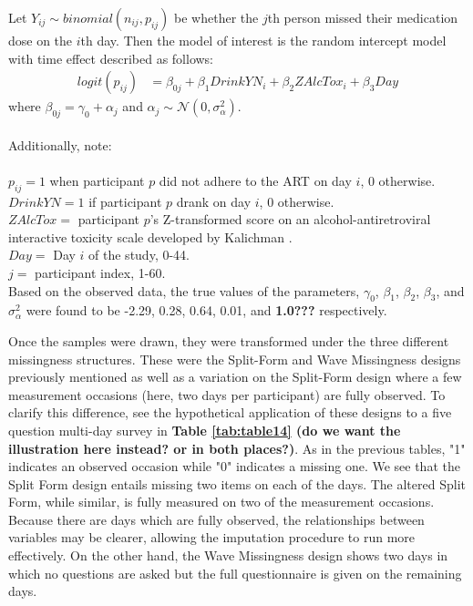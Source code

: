 \documentclass{svjour3}\usepackage[]{graphicx}\usepackage[]{color}
\begin{document}
Let $Y_{ij} \sim binomial(n_{ij},p_{ij})$ be whether the $j$th person missed their medication dose on the $i$th day. Then the model of interest is the random intercept model with time effect described as follows:
\begin{align*}
logit(p_{ij}) &= \beta_{0j} + \beta_1DrinkYN_i + \beta_2ZAlcTox_i +\beta_3Day
\end{align*}
where $\beta_{0j} = \gamma_0 + \alpha_j$ and $\alpha_j \sim \mathcal{N}(0,\sigma_\alpha^2)$. \\ \\ 
Additionally, note: \\ \\
$p_{ij} = 1$ when participant $p$ did not adhere to the ART on day $i$, 0 otherwise. \\
$DrinkYN = 1$ if participant $p$  drank on day $i$, 0 otherwise.\\
$ZAlcTox =$ participant $p$'s Z-transformed score on an alcohol-antiretroviral interactive toxicity scale developed by Kalichman \cite{kalichman2009prevalence}. \\
$Day =$ Day $i$ of the study, 0-44. \\
$j =$ participant index, 1-60. \\


Based on the observed data, the true values of the parameters, $\gamma_0$, $\beta_1$, $\beta_2$, $\beta_3$, and $\sigma_\alpha^2$ were found to be -2.29, 0.28, 0.64, 0.01, and \textbf{1.0???} respectively. \par
Once the samples were drawn, they were transformed under the three different missingness structures. These were the Split-Form and Wave Missingness designs previously mentioned as well as a variation on the Split-Form design where a few measurement occasions (here, two days per participant) are fully observed. To clarify this difference, see the hypothetical application of these designs to a five question multi-day survey in \textbf{Table \ref{tab:table14} (do we want the illustration here instead? or in both places?)}. As in the previous tables, "1" indicates an observed occasion while "0" indicates a missing one. We see that the Split Form design entails missing two items on each of the days. The altered Split Form, while similar, is fully measured on two of the measurement occasions. Because there are days which are fully observed, the relationships between variables may be clearer, allowing the imputation procedure to run more effectively. On the other hand, the Wave Missingness design shows two days in which no questions are asked but the full questionnaire is given on the remaining days. \par
\end{document}
